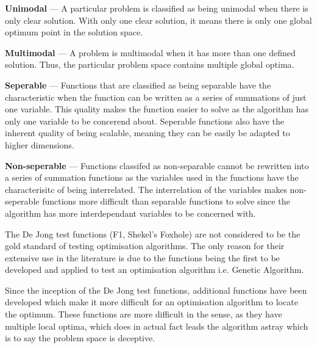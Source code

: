 \begin{description}
\item{\textbf{Unimodal}} --- A particular problem is classified as being unimodal when there is only clear solution. With only one clear solution, it means there is only one global optimum point in the solution space\cite{evalevoalgo,numericalABC,FundamentalSwarm,CompuIntelligenceIntro}.
\item{\textbf{Multimodal}} --- A problem is multimodal when it has more than one defined solution. Thus, the particular problem space contains multiple global optima\cite{evalevoalgo,numericalABC,FundamentalSwarm,CompuIntelligenceIntro}.
\item{\textbf{Seperable}} --- Functions that are classified as being separable have the characteristic when the function can be written as a series of summations of just one variable\cite{numericalABC}. This quality makes the function easier to solve as the algorithm has only one variable to be concerend about\cite{evalevoalgo,numericalABC}. Seperable functions also have the inherent quality of being scalable, meaning they can be easily be adapted to higher dimensions\cite{evalevoalgo,numericalABC}.
\item{\textbf{Non-seperable}} --- Functions classifed as non-separable cannot be rewritten into a series of summation functions as the variables used in the functions have the characterisitc of being interrelated\cite{evalevoalgo,numericalABC}. The interrelation of the variables makes non-seperable functions more difficult than separable functions to solve since the algorithm has more interdependant variables to be concerned with\cite{evalevoalgo,numericalABC}.
\end{description}

The De Jong test functions (F1, Shekel's Foxhole) are not considered to be the gold standard of testing optimisation algorithms\cite{evalevoalgo}. The only reason for their extensive use in the literature is due to the functions being the first to be developed and applied to test an optimisation algorithm i.e. Genetic Algorithm\cite{devparallelgasa,evalevoalgo}.

Since the inception of the De Jong test functions, additional functions have been developed which make it more difficult for an optimisation algorithm to locate the optimum\cite{evalevoalgo}. These functions are more difficult in the sense, as they have multiple local optima, which does in actual fact leads the algorithm astray which is to say the problem space is deceptive\cite{CompuIntelligenceIntro,FundamentalSwarm,evalevoalgo}. 

